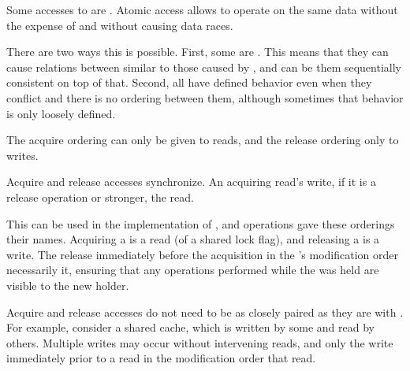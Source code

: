 
Some accesses to  are . Atomic
access allows  to operate on the same data without the
expense of  and without causing data races.

There are two ways this is possible. First, some  are . This means that
they can cause  relations between
 similar to those caused by , and can be
them sequentially consistent on top of that. Second, all  have defined behavior even when they conflict and there is
no  ordering between them, although sometimes
that behavior is only loosely defined.

\endsubsubsection%

\endsubsubsection%

\endsubsubsection%

\endsubsubsection%

\endsubsubsection%

\endsubsection%


The acquire ordering can only be given to reads, and the release
ordering only to writes.

Acquire and release accesses synchronize. An acquiring read's write,
if it is a release operation or stronger,  the
read.

This can be used in the implementation of , and
 operations gave these orderings their names. Acquiring a
 is a read (of a shared lock flag), and releasing a
 is a write. The release immediately before the acquisition
in the 's modification order necessarily
 it, ensuring that any operations performed
while the  was held are visible to the new 
holder.

Acquire and release accesses do not need to be as closely paired as
they are with . For example, consider a shared cache,
which is written by some  and read by others. Multiple
writes may occur without intervening reads, and only the write
immediately prior to a read in the modification order
 that read.

